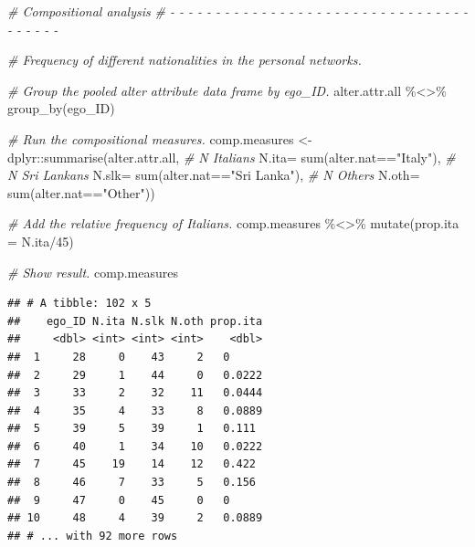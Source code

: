 \documentclass[
]{book}
\newenvironment{Shaded}{\begin{snugshade}}{\end{snugshade}}
\newcommand{\AttributeTok}[1]{\textcolor[rgb]{0.77,0.63,0.00}{#1}}
\newcommand{\CommentTok}[1]{\textcolor[rgb]{0.56,0.35,0.01}{\textit{#1}}}
\newcommand{\DecValTok}[1]{\textcolor[rgb]{0.00,0.00,0.81}{#1}}
\newcommand{\FunctionTok}[1]{\textcolor[rgb]{0.00,0.00,0.00}{#1}}
\newcommand{\NormalTok}[1]{#1}
\newcommand{\OtherTok}[1]{\textcolor[rgb]{0.56,0.35,0.01}{#1}}
\newcommand{\SpecialCharTok}[1]{\textcolor[rgb]{0.00,0.00,0.00}{#1}}
\newcommand{\StringTok}[1]{\textcolor[rgb]{0.31,0.60,0.02}{#1}}
\begin{document}
\begin{Shaded}
\begin{Highlighting}[]
\CommentTok{\# Compositional analysis}
\CommentTok{\# {-} {-} {-} {-} {-} {-} {-} {-} {-} {-} {-} {-} {-} {-} {-} {-} {-} {-} {-} {-} {-} {-} {-} {-} {-} {-} {-} {-} {-} {-} {-} {-} {-} {-} {-} {-} {-} {-} {-} }

\CommentTok{\# Frequency of different nationalities in the personal networks.}

\CommentTok{\# Group the pooled alter attribute data frame by ego\_ID.}
\NormalTok{alter.attr.all }\SpecialCharTok{\%\textless{}\textgreater{}\%} 
  \FunctionTok{group\_by}\NormalTok{(ego\_ID)}

\CommentTok{\# Run the compositional measures.}
\NormalTok{comp.measures }\OtherTok{\textless{}{-}}\NormalTok{ dplyr}\SpecialCharTok{::}\FunctionTok{summarise}\NormalTok{(alter.attr.all, }
                                  \CommentTok{\# N Italians}
                                  \AttributeTok{N.ita=} \FunctionTok{sum}\NormalTok{(alter.nat}\SpecialCharTok{==}\StringTok{"Italy"}\NormalTok{), }
                                  \CommentTok{\# N Sri Lankans}
                                  \AttributeTok{N.slk=} \FunctionTok{sum}\NormalTok{(alter.nat}\SpecialCharTok{==}\StringTok{"Sri Lanka"}\NormalTok{), }
                                  \CommentTok{\# N Others}
                                  \AttributeTok{N.oth=} \FunctionTok{sum}\NormalTok{(alter.nat}\SpecialCharTok{==}\StringTok{"Other"}\NormalTok{))}

\CommentTok{\# Add the relative frequency of Italians.}
\NormalTok{comp.measures }\SpecialCharTok{\%\textless{}\textgreater{}\%}
  \FunctionTok{mutate}\NormalTok{(}\AttributeTok{prop.ita =}\NormalTok{ N.ita}\SpecialCharTok{/}\DecValTok{45}\NormalTok{)}

\CommentTok{\# Show result.}
\NormalTok{comp.measures}
\end{Highlighting}
\end{Shaded}

\begin{verbatim}
## # A tibble: 102 x 5
##    ego_ID N.ita N.slk N.oth prop.ita
##     <dbl> <int> <int> <int>    <dbl>
##  1     28     0    43     2   0     
##  2     29     1    44     0   0.0222
##  3     33     2    32    11   0.0444
##  4     35     4    33     8   0.0889
##  5     39     5    39     1   0.111 
##  6     40     1    34    10   0.0222
##  7     45    19    14    12   0.422 
##  8     46     7    33     5   0.156 
##  9     47     0    45     0   0     
## 10     48     4    39     2   0.0889
## # ... with 92 more rows
\end{verbatim}
\end{document}
